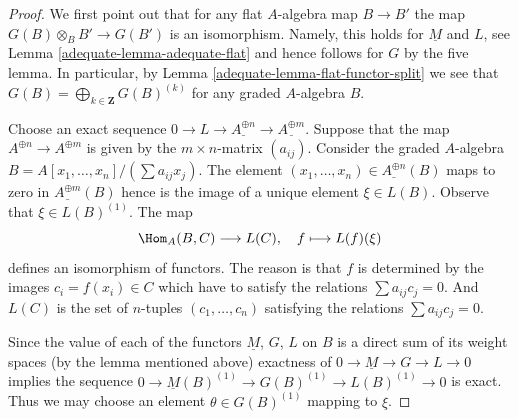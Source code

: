 \begin{proof}

We first point out that for any flat $A$-algebra map
$B \to B'$ the map $G(B) \otimes_B B' \to G(B')$ is an isomorphism.
Namely, this holds for $\underline{M}$ and $L$, see
Lemma \ref{adequate-lemma-adequate-flat}
and hence follows for $G$ by the five lemma. In particular, by
Lemma \ref{adequate-lemma-flat-functor-split}
we see that $G(B) = \bigoplus_{k \in \mathbf{Z}} G(B)^{(k)}$
for any graded $A$-algebra $B$.

\medskip\noindent
Choose an exact sequence
$0 \to L \to \underline{A^{\oplus n}} \to \underline{A^{\oplus m}}$.
Suppose that the map $A^{\oplus n} \to A^{\oplus m}$ is given by the
$m \times n$-matrix $(a_{ij})$. Consider the graded $A$-algebra
$B = A[x_1, \ldots, x_n]/(\sum a_{ij}x_j)$. The element
$(x_1, \ldots, x_n) \in \underline{A^{\oplus n}}(B)$ maps to zero in
$\underline{A^{\oplus m}}(B)$ hence is the image of a unique element
$\xi \in L(B)$. Observe that $\xi \in L(B)^{(1)}$. The map
$$
\Hom_A(B, C) \longrightarrow L(C), \quad
f \longmapsto L(f)(\xi)
$$
defines an isomorphism of functors. The reason is that $f$ is
determined by the images $c_i = f(x_i) \in C$ which have to
satisfy the relations $\sum a_{ij}c_j = 0$. And $L(C)$ is the
set of $n$-tuples $(c_1, \ldots, c_n)$ satisfying the relations
$\sum a_{ij} c_j = 0$.

\medskip\noindent
Since the value of each of the functors $\underline{M}$, $G$, $L$
on $B$ is a direct sum of its weight spaces (by the lemma mentioned
above) exactness of $0 \to \underline{M} \to G \to L \to 0$ implies
the sequence $0 \to \underline{M}(B)^{(1)} \to G(B)^{(1)} \to L(B)^{(1)} \to 0$
is exact. Thus we may choose an element $\theta \in G(B)^{(1)}$ mapping
to $\xi$.


\end{proof}
